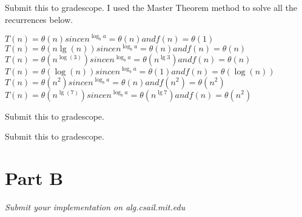 \documentclass[12pt,twoside]{article}
\begin{document}
\begin{problems}
\problem  Submit this to gradescope. I used the Master Theorem method to solve all the recurrences below.%

\begin{problemparts}

\problempart $ T(n) = \theta(n) since n^{\log_{b}a} = \theta(n)  and f(n) = \theta(1)  $
\problempart  $ T(n) = \theta(n\lg(n)) since n^{\log_{b}a} = \theta(n)  and f(n) = \theta(n) $
\problempart $ T(n) = \theta(n^{\log(3)}) since n^{\log_{b}a} = \theta(n^{\lg3})  and f(n) = \theta(n)$
\problempart $ T(n) = \theta(\log(n)) since n^{\log_{b}a} = \theta(1)  and f(n) = \theta(\log(n)) $
\problempart $ T(n) = \theta(n^{2}) since n^{\log_{b}a} = \theta(n)  and f(n^{2}) = \theta(n^{2}) $
\problempart $ T(n) = \theta(n^{\lg(7)}) since n^{\log_{b}a} = \theta(n^{\lg7})  and f(n) = \theta(n^{2}) $
\end{problemparts}

\problem  Submit this to gradescope. %


\problem Submit this to gradescope. %

\section*{Part B}

\problem
\begin{problemparts}
\problempart \emph{Submit your implementation on alg.csail.mit.edu}
\end{problemparts}

\end{problems}
\end{document}
